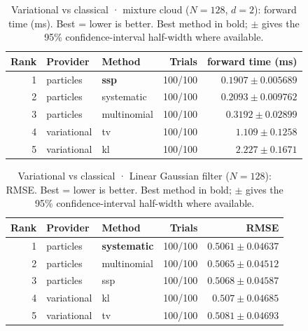 \begin{table}[!htbp]
\centering
\small
\caption{Variational vs classical · mixture cloud ($N=128$, $d=2$): forward time (ms). Best = lower is better. Best method in bold; $\pm$ gives the 95\% confidence-interval half-width where available.}
\label{tab:variational-vs-classical-mixture-cloud-forward-ms}
\begin{tabular}{rllrr}
\toprule
Rank & Provider & Method & Trials & forward time (ms) \\
\midrule
1 & particles & \textbf{ssp} & 100/100 & $\mathbf{0.1907 \pm 0.005689}$ \\
2 & particles & systematic & 100/100 & $0.2093 \pm 0.009762$ \\
3 & particles & multinomial & 100/100 & $0.3192 \pm 0.02899$ \\
4 & variational & tv & 100/100 & $1.109 \pm 0.1258$ \\
5 & variational & kl & 100/100 & $2.227 \pm 0.1671$ \\
\bottomrule
\end{tabular}
\end{table}


\begin{table}[!htbp]
\centering
\small
\caption{Variational vs classical · Linear Gaussian filter ($N=128$): RMSE. Best = lower is better. Best method in bold; $\pm$ gives the 95\% confidence-interval half-width where available.}
\label{tab:variational-vs-classical-linear-gaussian-filter-rmse}
\begin{tabular}{rllrr}
\toprule
Rank & Provider & Method & Trials & RMSE \\
\midrule
1 & particles & \textbf{systematic} & 100/100 & $\mathbf{0.5061 \pm 0.04637}$ \\
2 & particles & multinomial & 100/100 & $0.5065 \pm 0.04512$ \\
3 & particles & ssp & 100/100 & $0.5068 \pm 0.04587$ \\
4 & variational & kl & 100/100 & $0.507 \pm 0.04685$ \\
5 & variational & tv & 100/100 & $0.5081 \pm 0.04693$ \\
\bottomrule
\end{tabular}
\end{table}


